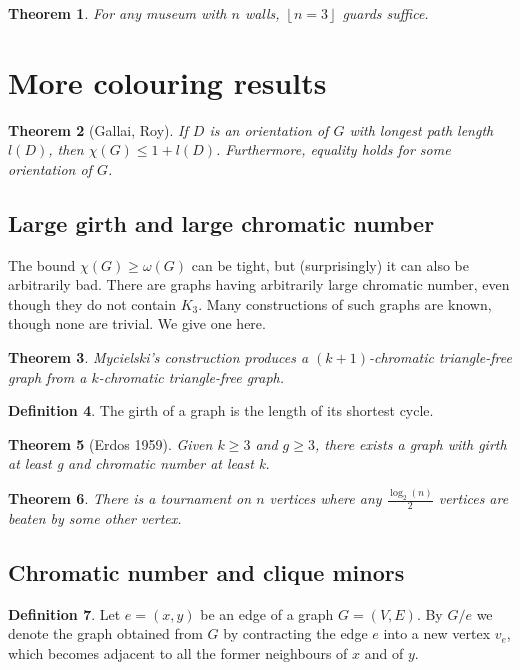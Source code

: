 \documentclass[10pt, fleqn, a4paper, landscape]{article}
\theoremstyle{plain} %
\newtheorem{thm}{Theorem}
\theoremstyle{remark} %
\theoremstyle{definition} %
\newtheorem{defi}[thm]{Definition}
\begin{document}
\begin{multicols}{3}
\begin{tiny}
\begin{thm}
For any museum with $n$ walls, $\left\lfloor n=3\right\rfloor$ guards suffice.
\end{thm}

\section{More colouring results}
\begin{thm}[Gallai, Roy]
If $D$ is an orientation of $G$ with longest path length $l(D)$, then $\chi(G) \le 1 + l(D)$. Furthermore, equality holds for some orientation of $G$.
\end{thm} 

\subsection{Large girth and large chromatic number}

The bound $\chi(G) \ge \omega(G)$ can be tight, but (surprisingly) it can also be arbitrarily bad. There are graphs having arbitrarily large chromatic number, even though they do not contain $K_3$. Many constructions of such graphs are known, though none are trivial. We give one here.
\addtocounter{thm}{1}
\begin{thm}
Mycielski’s construction produces a $(k + 1)$-chromatic triangle-free graph from a $k$-chromatic triangle-free graph.
\end{thm}

\begin{defi}
The girth of a graph is the length of its shortest cycle.
\end{defi}
\begin{thm}[Erdos 1959]
Given $k \ge 3$ and $g \ge 3$, there exists a graph with girth at least g and
chromatic number at least k.
\end{thm} 
\addtocounter{thm}{2}
\begin{thm}
There is a tournament on $n$ vertices where any $\frac{\log_2(n)}{2}$ vertices are beaten by some other vertex.
\end{thm}
\subsection{Chromatic number and clique minors}
\begin{defi}
Let $e = (x, y)$ be an edge of a graph $G = (V,E)$. By $G\slash e$ we denote the graph obtained from $G$ by contracting the edge $e$ into a new vertex $v_e$, which becomes adjacent to all the former neighbours of $x$ and of $y$. 


\end{defi}
\end{tiny}
\end{multicols}
\end{document}
